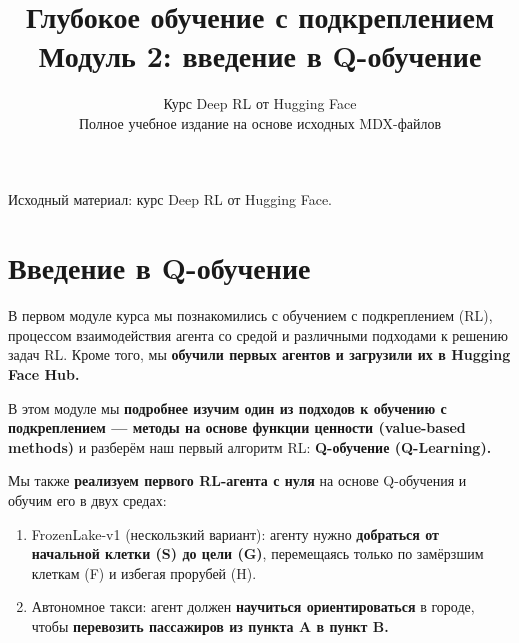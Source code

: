 \documentclass[11pt,a4paper]{article}
\title{\textbf{Глубокое обучение с подкреплением}\\[0.35em]\large Модуль 2: введение в Q-обучение}
\author{Курс Deep RL от Hugging Face\\\small Полное учебное издание на основе исходных MDX-файлов}
\date{}
\begin{document}
\selectfont
\maketitle
\vspace{-0.8em}
\begin{center}\small\color{secondary}Исходный материал: курс Deep RL от Hugging Face.\end{center}
\begingroup\small\setlength{\parskip}{0pt}\tableofcontents\endgroup
\vspace{1em}
\clearpage
\section{Введение в Q-обучение}\label{introduction-to-q-learning}


В первом модуле курса мы познакомились с обучением с подкреплением (RL), процессом взаимодействия агента со средой и различными подходами к решению задач RL. Кроме того, мы \textbf{обучили первых агентов и загрузили их в Hugging Face Hub.}

В этом модуле мы \textbf{подробнее изучим один из подходов к обучению с подкреплением --- методы на основе функции ценности (value-based methods)} и разберём наш первый алгоритм RL: \textbf{Q-обучение (Q-Learning).}

Мы также \textbf{реализуем первого RL-агента с нуля} на основе Q-обучения и обучим его в двух средах:

\begin{enumerate}
\def\labelenumi{\arabic{enumi}.}
\tightlist
\item
  FrozenLake-v1 (нескользкий вариант): агенту нужно \textbf{добраться от начальной клетки (S) до цели (G)}, перемещаясь только по замёрзшим клеткам (F) и избегая прорубей (H).
\item
  Автономное такси: агент должен \textbf{научиться ориентироваться} в городе, чтобы \textbf{перевозить пассажиров из пункта A в пункт B.}
\end{enumerate}

\end{document}
